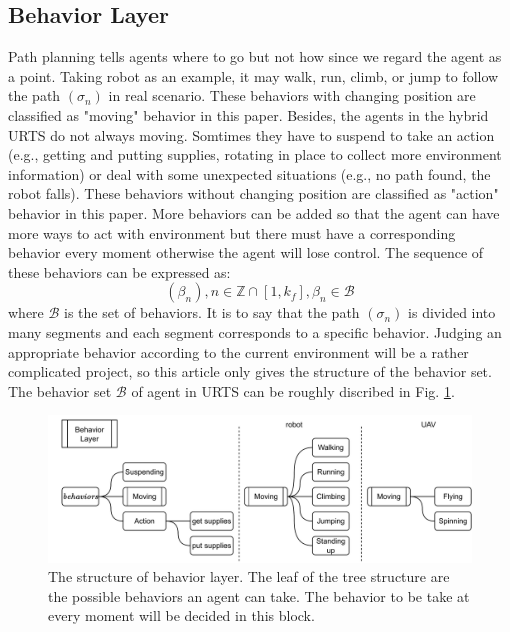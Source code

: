 \documentclass{ieeeaccess}
\begin{document}
\subsection{Behavior Layer}
Path planning tells agents where to go but not how since we regard the agent as a point. Taking robot as an example, it may walk, run, climb, or jump to follow the path $(\sigma_n)$ in real scenario. These behaviors with changing position are classified as "moving" behavior in this paper. Besides, the agents in the hybrid URTS do not always moving. Somtimes they have to suspend to take an action (e.g., getting and putting supplies, rotating in place to collect more environment information) or deal with some unexpected situations (e.g., no path found, the robot falls). These behaviors without changing position are classified as "action" behavior in this paper. More behaviors can be added so that the agent can have more ways to act with environment but there must have a corresponding behavior every moment otherwise the agent will lose control. The sequence of these behaviors can be expressed as:
\begin{equation}
    (\beta_n), n\in\mathbb{Z}\cap[1,k_f], \beta_n\in\mathcal{B}
\end{equation}
where $\mathcal{B}$ is the set of behaviors. It is to say that the path $(\sigma_n)$ is divided into many segments and each segment corresponds to a specific behavior. Judging an appropriate behavior according to the current environment will be a rather complicated project, so this article only gives the structure of the behavior set. The behavior set $\mathcal{B}$ of agent in URTS can be roughly discribed in Fig. \ref{fig:behavior}.

\begin{figure}[htbp]
    \centering
    \includegraphics[scale=.5]{fig/behavior.pdf}\caption{The structure of behavior layer. The leaf of the tree structure are the possible behaviors an agent can take. The behavior to be take at every moment will be decided in this block.}%
    \label{fig:behavior}
\end{figure}
\end{document}
